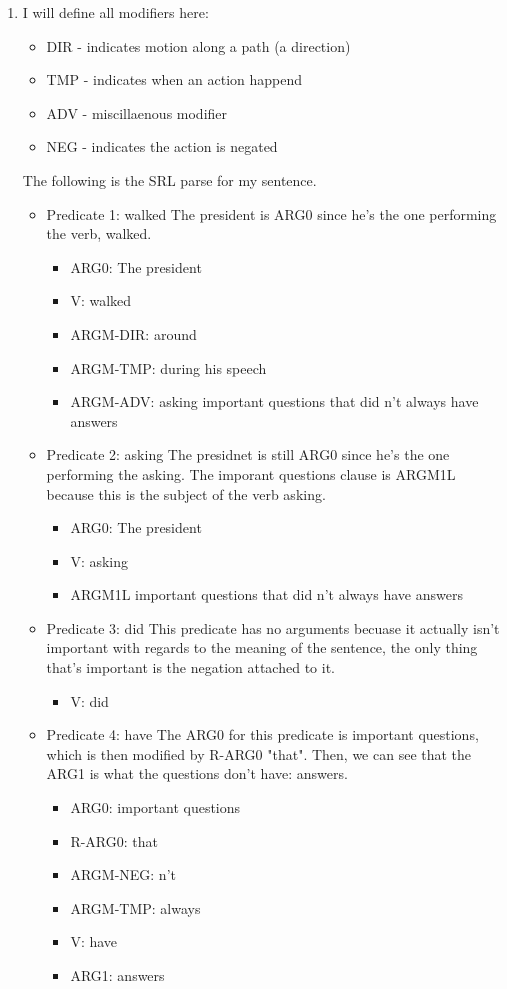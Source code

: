 \documentclass{article}
\let\n\newline
\begin{document}
\begin{enumerate}
	\item I will define all modifiers here: \begin{itemize}
		\item DIR - indicates motion along a path (a direction)
		\item TMP - indicates when an action happend
		\item ADV - miscillaenous modifier
		\item NEG - indicates the action is negated
		\end{itemize}
		The following is the SRL parse for my sentence.
		\begin{itemize}
			\item Predicate 1: walked\n
				The president is ARG0 since he's the one performing the verb, walked.
			\begin{itemize}
				\item ARG0: The president
				\item V: walked
				\item ARGM-DIR: around
				\item ARGM-TMP: during his speech
				\item ARGM-ADV: asking important questions that did n't always have answers
			\end{itemize}

			\item Predicate 2: asking\n
				The presidnet is still ARG0 since he's the one performing the asking. The imporant questions clause is ARGM1L because this is the subject of the verb asking.
				\begin{itemize}
				\item ARG0: The president
				\item V: asking
				\item ARGM1L important questions that did n't always have answers
			\end{itemize}

			\item Predicate 3: did \n
				This predicate has no arguments becuase it actually isn't important with regards to the meaning of the sentence, the only thing that's important is the negation attached to it.
			\begin{itemize}
				\item V: did
			\end{itemize}

			\item Predicate 4: have \n
				The ARG0 for this predicate is important questions, which is then modified by R-ARG0 "that". Then, we can see that the ARG1 is what the questions don't have: answers.
			\begin{itemize}
				\item ARG0: important questions
				\item R-ARG0: that
				\item ARGM-NEG: n't
				\item ARGM-TMP: always
				\item V: have
				\item ARG1: answers
			\end{itemize}
		\end{itemize}


\end{enumerate}
\end{document}
